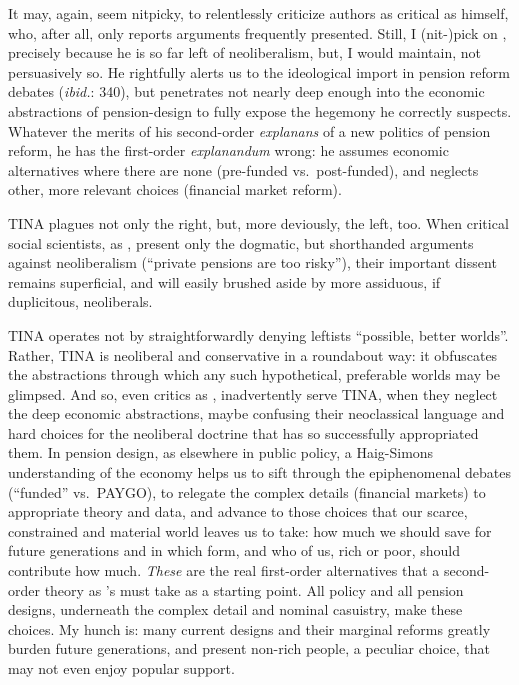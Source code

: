 It may, again, seem nitpicky, to relentlessly criticize authors as critical as \cite{Cerami2009a} himself, who, after all, only reports arguments frequently presented. Still, I (nit-)pick on \citeauthor{Cerami2009a}, precisely because he is so far left of neoliberalism, but, I would maintain, not persuasively so. He rightfully alerts us to the ideological import in pension reform debates (\emph{ibid.}: 340), but penetrates not nearly deep enough into the economic abstractions of pension-design to fully expose the hegemony he correctly suspects. Whatever the merits of his second-order \emph{explanans} of a new politics of pension reform, he has the first-order \emph{explanandum} wrong: he assumes economic alternatives where there are none (pre-funded vs.\ post-funded), and neglects other, more relevant choices (financial market reform).

TINA plagues not only the right, but, more deviously, the left, too. When critical social scientists, as \cite{Cerami2009a}, present only the dogmatic, but shorthanded arguments against neoliberalism (``private pensions are too risky''), their important dissent remains superficial, and will easily brushed aside by more assiduous, if duplicitous, neoliberals.

TINA operates not by straightforwardly denying leftists ``possible, better worlds''. Rather, TINA is neoliberal and conservative in a roundabout way: it obfuscates the abstractions through which any such hypothetical, preferable worlds may be glimpsed.
And so, even critics as \citeauthor{Cerami2009a}, inadvertently serve TINA, when they neglect the deep economic abstractions, maybe confusing their neoclassical language and hard choices for the neoliberal doctrine that has so successfully appropriated them. In pension design, as elsewhere in public policy, a Haig-Simons understanding of the economy helps us to sift through the epiphenomenal debates (``funded'' vs.\ PAYGO), to relegate the complex details (financial markets) to appropriate theory and data, and advance to those choices that our scarce, constrained and material world leaves us to take: how much we should save for future generations and in which form, and who of us, rich or poor, should contribute how much. \emph{These} are the real first-order alternatives that a second-order theory as \citeauthor{Cerami2009a}'s must take as a starting point. All policy and all pension designs, underneath the complex detail and nominal casuistry, make these choices. My hunch is: many  current designs and their marginal reforms greatly burden future generations, and present non-rich people, a peculiar choice, that may not even enjoy popular support.

